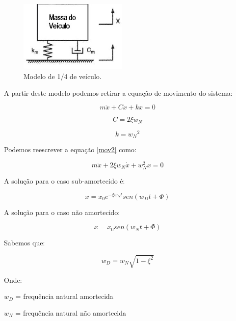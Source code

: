 \begin{figure}[H]
	\centering
	\includegraphics[width=150pt]{figuras/sistema_massa.png}
	\caption{Modelo de 1/4 de veículo.}
	\label{modelomassa}
\end{figure}

A partir deste modelo podemos retirar a equação de movimento do sistema:

\begin{equation} \label{mov2}
m\ddot{x}+ C \dot{x} + kx = 0 
\end{equation} 

\begin{equation} \label{mov3} 
C=2\xi w_N 
\end{equation} 

\begin{equation} \label{mov4} 
k = {w_N}^2 
\end{equation} 

Podemos reescrever a equação \eqref{mov2} como:

\begin{equation} \label{mov5} 
m\ddot{x} + 2\xi w_N\dot{x} + w^2_Nx = 0
\end{equation} 

A solução para o caso sub-amortecido é:

\begin{equation} \label{mov6} 
x=x_0e^{-\xi w_Nt}sen\left(w_Dt + \Phi \right) 
\end{equation} 

A solução para o caso não amortecido:

\begin{equation} \label{mov7} 
x = x_0sen(w_Nt + \Phi)
\end{equation} 

Sabemos que:

\begin{equation} \label{mov8} 
w_D = w_N\sqrt{1 - {\xi }^2}
\end{equation} 

Onde: 

\noindent $w_D$ = frequência natural amortecida

\noindent $w_N$ = frequência natural não amortecida

